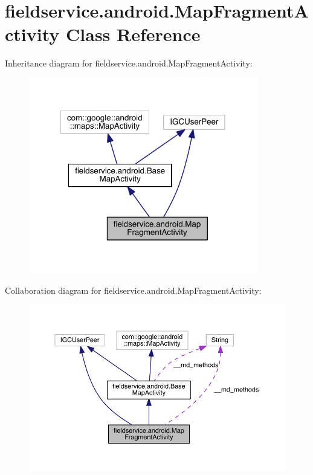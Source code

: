 \hypertarget{classfieldservice_1_1android_1_1_map_fragment_activity}{\section{fieldservice.\+android.\+Map\+Fragment\+Activity Class Reference}
\label{classfieldservice_1_1android_1_1_map_fragment_activity}
}


Inheritance diagram for fieldservice.\+android.\+Map\+Fragment\+Activity\+:
\nopagebreak
\begin{figure}[H]
\begin{center}
\leavevmode
\includegraphics[width=284pt]{classfieldservice_1_1android_1_1_map_fragment_activity__inherit__graph}
\end{center}
\end{figure}


Collaboration diagram for fieldservice.\+android.\+Map\+Fragment\+Activity\+:
\nopagebreak
\begin{figure}[H]
\begin{center}
\leavevmode
\includegraphics[width=350pt]{classfieldservice_1_1android_1_1_map_fragment_activity__coll__graph}
\end{center}
\end{figure}

